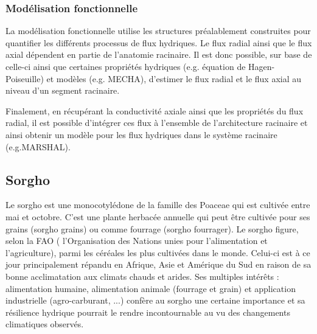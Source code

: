 \subsubsection{Modélisation fonctionnelle}

La modélisation fonctionnelle utilise les structures préalablement construites pour quantifier les différents processus de flux hydriques.
Le flux radial ainsi que le flux axial dépendent en partie de l'anatomie racinaire.
Il est donc possible, sur base de celle-ci ainsi que certaines propriétés hydriques (e.g. équation de Hagen-Poiseuille) et modèles (e.g. MECHA), d'estimer le flux radial et le flux axial au niveau d'un segment racinaire.
\newline

Finalement, en récupérant la conductivité axiale ainsi que les propriétés du flux radial, il est possible d'intégrer ces flux à l'ensemble de l'architecture racinaire et ainsi obtenir un modèle pour les flux hydriques dans le système racinaire (e.g.MARSHAL).

\subsection{Sorgho}
Le sorgho est une monocotylédone de la famille des Poaceae qui est cultivée entre mai et octobre.
C'est une plante herbacée annuelle qui peut être cultivée pour ses grains (sorgho grains) ou comme fourrage (sorgho fourrager).
Le sorgho figure, selon la FAO ( l'Organisation des Nations unies pour l'alimentation et l'agriculture), parmi les céréales les plus cultivées dans le monde. 
Celui-ci est à ce jour principalement répandu en Afrique, Asie et Amérique du Sud en raison de sa bonne acclimatation aux climats chauds et arides.
Ses multiples intérêts : alimentation humaine, alimentation animale (fourrage et grain) et application industrielle (agro-carburant, ...) confère au sorgho une certaine importance et sa résilience hydrique pourrait le rendre incontournable au vu des changements climatiques observés.
\newline

